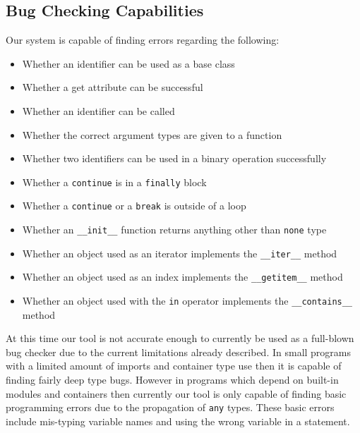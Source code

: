 \documentclass[12pt, titlepage]{article}
\begin{document}
\subsection{Bug Checking Capabilities}
Our system is capable of finding errors regarding the following:
\begin{itemize}
	\item Whether an identifier can be used as a base class
	\item Whether a get attribute can be successful
	\item Whether an identifier can be called
	\item Whether the correct argument types are given to a function
	\item Whether two identifiers can be used in a binary operation successfully
	\item Whether a \texttt{continue} is in a \texttt{finally} block
	\item Whether a \texttt{continue} or a \texttt{break} is outside of a loop
	\item Whether an \texttt{\_\_init\_\_} function returns anything other than \texttt{none} type
	\item Whether an object used as an iterator implements the \texttt{\_\_iter\_\_} method
	\item Whether an object used as an index implements the \texttt{\_\_getitem\_\_} method
	\item Whether an object used with the \texttt{in} operator implements the \texttt{\_\_contains\_\_} method
\end{itemize}
At this time our tool is not accurate enough to currently be used as a full-blown bug checker due to the current limitations already described. In small programs with a limited amount of imports and container type use then it is capable of finding fairly deep type bugs. However in programs which depend on built-in modules and containers then currently our tool is only capable of finding basic programming errors due to the propagation of \texttt{any} types. These basic errors include mis-typing variable names and using the wrong variable in a statement.

\newpage
\end{document}
